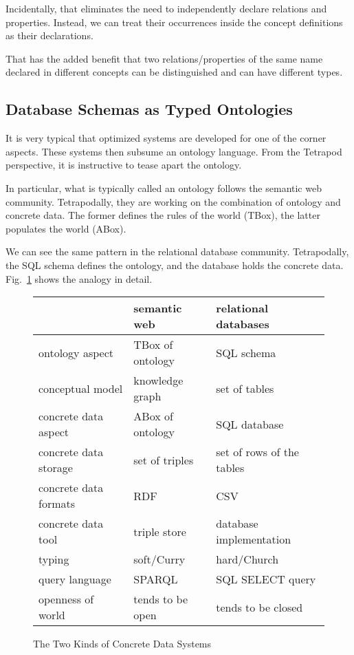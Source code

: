 Incidentally, that eliminates the need to independently declare relations and properties.
Instead, we can treat their occurrences inside the concept definitions as their declarations.

That has the added benefit that two relations/properties of the same name declared in different concepts can be distinguished and can have different types.

\subsection{Database Schemas as Typed Ontologies}

It is very typical that optimized systems are developed for one of the corner aspects.
These systems then subsume an ontology language.
From the Tetrapod perspective, it is instructive to tease apart the ontology.

In particular, what is typically called an ontology follows the semantic web community.
Tetrapodally, they are working on the combination of ontology and concrete data.
The former defines the rules of the world (TBox), the latter populates the world (ABox).

We can see the same pattern in the relational database community.
Tetrapodally, the SQL schema defines the ontology, and the database holds the concrete data.
Fig.~\ref{fig:semweb-reldb} shows the analogy in detail.

\begin{figure}[hbt]
\begin{center}
\begin{tabular}{l|ll}
  & semantic web & relational databases \\
\hline
ontology aspect & TBox of ontology & SQL schema \\
conceptual model & knowledge graph & set of tables \\
concrete data aspect & ABox of ontology & SQL database \\
concrete data storage & set of triples & set of rows of the tables \\
concrete data formats & RDF & CSV \\
concrete data tool & triple store & database implementation \\
typing & soft/Curry & hard/Church\\
query language & SPARQL & SQL SELECT query \\
openness of world & tends to be open & tends to be closed \\
\end{tabular}
\caption{The Two Kinds of Concrete Data Systems}\label{fig:semweb-reldb}
\end{center}
\end{figure}

